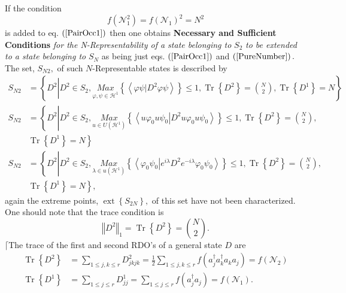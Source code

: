 \documentclass[aps,preprint]{revtex4}%
\begin{document}
If the condition
\begin{equation}
f\left(  \mathcal{N}_{1}^{2}\right)  =f\left(  \mathcal{N}_{1}\right)
^{2}=N^{2} \label{PureNumber}%
\end{equation}
is added to eq. $\left(  \ref{PairOcc1}\right)  $ then one obtains
\textbf{Necessary and Sufficient Conditions} \emph{for the N-Representability
of a state belonging to }$S_{2}$ \emph{to be extended to a state belonging to
}$S_{N}$ as being just eqs. $\left(  \ref{PairOcc1}\right)  $ and $\left(
\ref{PureNumber}\right)  .$The set, $S_{N2},$ of such $N$-Representable states
is described by
\begin{align}
S_{N2}  &  =\left\{  D^{2}\left\vert D^{2}\in S_{2},\underset{\varphi,\psi
\in\mathcal{H}^{1}}{Max}\left\{  \left\langle \left.  \varphi\psi\right\vert
D^{2}\varphi\psi\right\rangle \right\}  \leq1,\operatorname*{Tr}\left\{
D^{2}\right\}  =\binom{N}{2},\operatorname*{Tr}\left\{  D^{1}\right\}
=N\right.  \right\} \nonumber\\
S_{N2}  &  =\left\{  D^{2}\left\vert D^{2}\in S_{2},\underset{u\in U\left(
\mathcal{H}^{1}\right)  }{Max}\left\{  \left\langle \left.  u\varphi_{0}%
u\psi_{0}\right\vert D^{2}u\varphi_{0}u\psi_{0}\right\rangle \right\}
\leq1,\operatorname*{Tr}\left\{  D^{2}\right\}  =\binom{N}{2},\right.  \right.
\nonumber\\
&  \left.  \operatorname*{Tr}\left\{  D^{1}\right\}  =N\right\} \nonumber\\
S_{N2}  &  =\left\{  D^{2}\left\vert D^{2}\in S_{2},\underset{\lambda\in
u\left(  \mathcal{H}^{1}\right)  }{Max}\left\{  \left\langle \left.
\varphi_{0}\psi_{0}\right\vert e^{i\lambda}D^{2}e^{-i\lambda}\varphi_{0}%
\psi_{0}\right\rangle \right\}  \leq1,\operatorname*{Tr}\left\{
D^{2}\right\}  =\binom{N}{2},\right.  \right. \nonumber\\
&  \left.  \operatorname*{Tr}\left\{  D^{1}\right\}  =N\right\}  ,
\end{align}
again the extreme points, $\operatorname*{ext}\left\{  S_{2N}\right\}  ,$ of
this set have not been characterized. One should note that the trace condition
is
\begin{equation}
\left\Vert D^{2}\right\Vert _{1}=\operatorname*{Tr}\left\{  D^{2}\right\}
=\binom{N}{2}.
\end{equation}
$\lceil$The trace of the first and second RDO's of a general state $D$ are
\begin{align}
\operatorname*{Tr}\left\{  D^{2}\right\}   &  =\sum_{1\leq j,k\leq r}%
D_{jkjk}^{2}=\frac{1}{2}\sum_{1\leq j,k\leq r}f\left(  a_{j}^{\dagger}%
a_{k}^{\dagger}a_{k}a_{j}\right)  =f\left(  \mathcal{N}_{2}\right) \\
\operatorname*{Tr}\left\{  D^{1}\right\}   &  =\sum_{1\leq j\leq r}D_{jj}%
^{1}=\sum_{1\leq j\leq r}f\left(  a_{j}^{\dagger}a_{j}\right)  =f\left(
\mathcal{N}_{1}\right)  .
\end{align}
\end{document}
